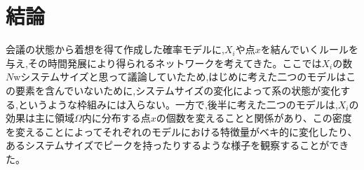 \chapter{結論}

会議の状態から着想を得て作成した確率モデルに,$X_{i}$や点$x$を結んでいくルールを与え,その時間発展により得られるネットワークを考えてきた。ここでは$X_{i}$の数$N$wシステムサイズと思って議論していたため,はじめに考えた二つのモデルはこの要素を含んでいないために,システムサイズの変化によって系の状態が変化する,というような枠組みには入らない。一方で,後半に考えた二つのモデルは,$X_{i}$の効果は主に領域$\Omega$内に分布する点$x$の個数を変えることと関係があり、この密度を変えることによってそれぞれのモデルにおける特徴量がベキ的に変化したり、あるシステムサイズでピークを持ったりするような様子を観察することができた。

